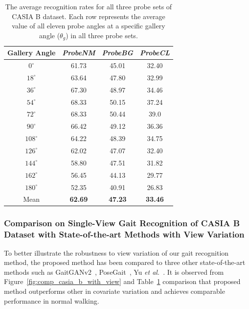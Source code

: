\begin{table}[t]
	\centering
	\caption{The average recognition rates for all three probe sets of CASIA B dataset. Each row represents the average value of all eleven probe angles at a specific gallery angle ($ \theta_g $) in all three probe sets. \label{table:comp_casia_b_with_view}}
	
	{\begin{tabular*}{22pc}{cccc}\hline
			Gallery Angle &\textit{ProbeNM} &\textit{ProbeBG} &\textit{ProbeCL} \\\hline\noalign{\smallskip}
			${0^{\circ}}$	&61.73  &45.01  &32.40 \\\noalign{\smallskip}
			${18^{\circ}}$  &63.64  &47.80  &32.99 \\\noalign{\smallskip}
			${36^{\circ}}$	&67.30  &48.97  &34.46 \\\noalign{\smallskip}
			${54^{\circ}}$	&68.33  &50.15  &37.24 \\\noalign{\smallskip}
			${72^{\circ}}$	&68.33  &50.44  &39.0  \\\noalign{\smallskip}
			${90^{\circ}}$	&66.42  &49.12  &36.36  \\\noalign{\smallskip}
			${108^{\circ}}$ &64.22  &48.39  &34.75  \\\noalign{\smallskip}
			${126^{\circ}}$ &62.02  &47.07  &32.40  \\\noalign{\smallskip}
			${144^{\circ}}$ &58.80  &47.51  &31.82  \\\noalign{\smallskip}
			${162^{\circ}}$	&56.45  &44.13  &29.77  \\\noalign{\smallskip}
			${180^{\circ}}$ &52.35  &40.91  &26.83  \\\noalign{\smallskip}
			Mean &\textbf{62.69}  &\textbf{47.23} &\textbf{33.46} \\\hline
			
	\end{tabular*}}{}
\end{table}



\subsubsection{Comparison on Single-View Gait Recognition of CASIA B Dataset with State-of-the-art Methods with View Variation}
To better illustrate the robustness to view variation of our gait recognition method, the proposed method has been compared to three other state-of-the-art methods such as GaitGANv2~\cite{Yu_19}, PoseGait~\cite{Liao_19}, Yu \textit{et al.}~\cite{Yu_17_spae}.  It is observed from Figure~\ref{fig:comp_casia_b_with_view} and Table~\ref{table:comp_casia_b_with_view} comparison that proposed method outperforms other in covariate variation and achieves comparable performance in normal walking. 

